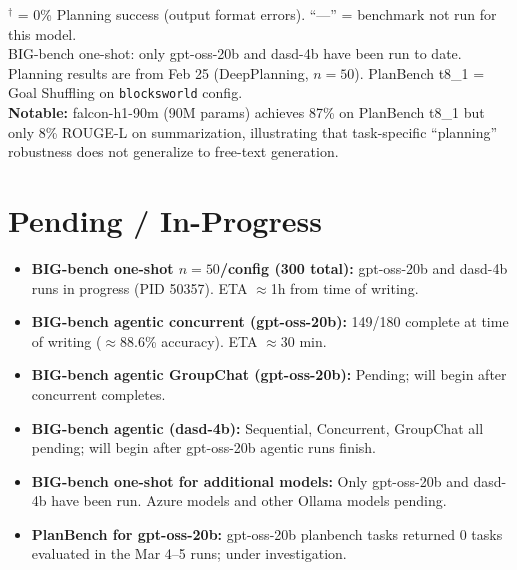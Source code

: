 \documentclass[11pt,letterpaper]{article}
\begin{document}
\begin{table}[h!]
\vspace{4pt}
{\footnotesize\textcolor{notegray}{
$^\dagger$ = 0\% Planning success (output format errors). ``---'' = benchmark not run for this model.\\
BIG-bench one-shot: only gpt-oss-20b and dasd-4b have been run to date. Planning results are from Feb 25 (DeepPlanning, $n=50$). PlanBench t8\_1 = Goal Shuffling on \texttt{blocksworld} config.\\
\textbf{Notable:} falcon-h1-90m (90M params) achieves 87\% on PlanBench t8\_1 but only 8\% ROUGE-L on summarization, illustrating that task-specific ``planning'' robustness does not generalize to free-text generation.
}}
\end{table}

\vspace{0.5cm}

\section*{Pending / In-Progress}

\begin{itemize}
  \item \textbf{BIG-bench one-shot $n=50$/config (300 total):} gpt-oss-20b and dasd-4b runs in progress (PID 50357). ETA $\approx$1h from time of writing.
  \item \textbf{BIG-bench agentic concurrent (gpt-oss-20b):} 149/180 complete at time of writing ($\approx$88.6\% accuracy). ETA $\approx$30 min.
  \item \textbf{BIG-bench agentic GroupChat (gpt-oss-20b):} Pending; will begin after concurrent completes.
  \item \textbf{BIG-bench agentic (dasd-4b):} Sequential, Concurrent, GroupChat all pending; will begin after gpt-oss-20b agentic runs finish.
  \item \textbf{BIG-bench one-shot for additional models:} Only gpt-oss-20b and dasd-4b have been run. Azure models and other Ollama models pending.
  \item \textbf{PlanBench for gpt-oss-20b:} gpt-oss-20b planbench tasks returned 0 tasks evaluated in the Mar 4--5 runs; under investigation.
\end{itemize}
\end{document}
